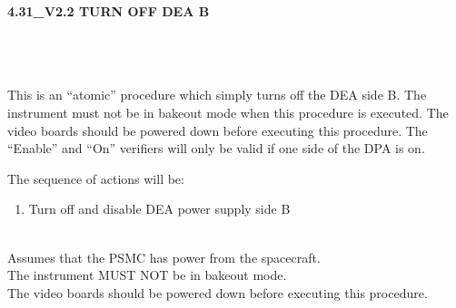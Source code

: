 \documentclass[11pt]{article}
\begin{document}
%
%
%
\newcommand{\be}{\begin{enumerate}}
\newcommand{\ee}{\end{enumerate}}
\newcommand{\bc}{\begin{center}}
\newcommand{\ec}{\end{center}}
\newcommand{\bi}{\begin{itemize}}
\newcommand{\ei}{\end{itemize}}
\newcommand{\bd}{\begin{description}}
\newcommand{\ed}{\end{description}}
\newcommand{\bt}{\begin{tabbing}}
\newcommand{\et}{\end{tabbing}}
\newcommand{\eg}{{\it e.g.~}}
\newcommand{\ie}{{\it i.e.~}}
\newcommand{\ul}{\underline}
\newcommand{\axaf}{{\em AXAF}}
\def\la{\hbox{\rlap{$<$}\lower0.5ex\hbox{$\sim$}\ }}


\large
\centerline {\bf 4.31\_V2.2 TURN OFF DEA B  }
\vspace{0.25in}

\normalsize
{}\\
 \\


 \\
\normalsize
This is an ``atomic'' procedure which simply turns off the DEA side B.
The instrument must not be in bakeout mode when this procedure is
executed. The video boards should be powered down before executing this
procedure.  The ``Enable'' and ``On'' verifiers will only be valid if
one side of the DPA is on.



\vspace{0.25in}
\noindent The sequence of actions will be:
\be
\item  Turn off and disable DEA power supply side B
\ee


\vspace{0.15in}
\normalsize
{} \\
\normalsize
Assumes that the PSMC has power from the spacecraft. \\
The instrument MUST NOT be in bakeout mode.\\
The video boards should be powered down before executing this procedure.\\
\end{document}
